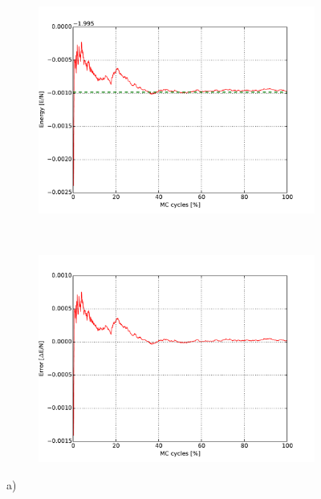 \begin{figure}[H]
    \centering
    \begin{subfigure}{0.5\textwidth}
        \centering
        \includegraphics[width=\linewidth]{result/bilder/2x2/energy22}
        \caption{}
    \end{subfigure}%
    ~ 
    \begin{subfigure}{0.5\textwidth}
        \centering
        \includegraphics[width=\linewidth]{result/bilder/2x2/energyerror22}
        \caption{}
    \end{subfigure}
    \caption{a) }
    \label{fig:22-energy}
\end{figure}

